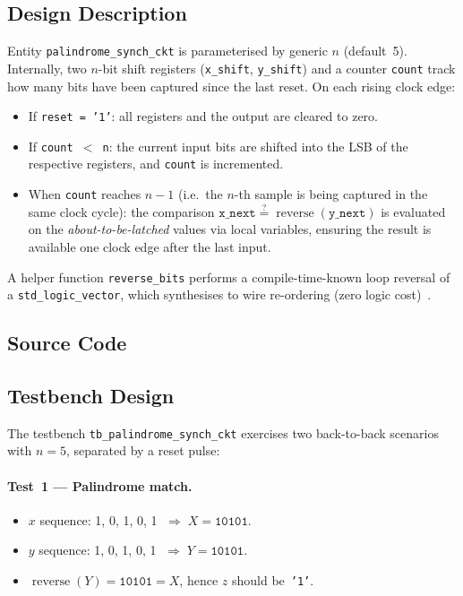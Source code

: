 \documentclass[12pt]{article}
\begin{document}
\subsection{Design Description}

Entity \texttt{palindrome\_synch\_ckt} is parameterised by
generic $n$ (default~5). Internally, two $n$-bit shift registers
(\texttt{x\_shift}, \texttt{y\_shift}) and a counter \texttt{count}
track how many bits have been captured since the last reset. On each
rising clock edge:

\begin{itemize}[nosep]
  \item If \texttt{reset = '1'}: all registers and the output are
        cleared to zero.
  \item If \texttt{count $<$ n}: the current input bits are shifted into
        the LSB of the respective registers, and \texttt{count} is
        incremented.
  \item When \texttt{count} reaches $n - 1$ (i.e.\ the $n$-th sample is
        being captured in the same clock cycle): the comparison
        $\texttt{x\_next} \stackrel{?}{=}
        \operatorname{reverse}(\texttt{y\_next})$ is evaluated on the
        \emph{about-to-be-latched} values via local variables, ensuring
        the result is available one clock edge after the last input.
\end{itemize}

\noindent
A helper function \texttt{reverse\_bits} performs a compile-time-known
loop reversal of a \texttt{std\_logic\_vector}, which synthesises to
wire re-ordering (zero logic cost)~\cite{pedroni2010}.

\subsection{Source Code}


\subsection{Testbench Design}
\label{sec:palindrome:tb}

The testbench \texttt{tb\_palindrome\_synch\_ckt} exercises two
back-to-back scenarios with $n = 5$, separated by a reset pulse:

\paragraph{Test~1 --- Palindrome match.}
\begin{itemize}[nosep]
  \item $x$ sequence: 1, 0, 1, 0, 1 $\;\Rightarrow\; X = \texttt{10101}$.
  \item $y$ sequence: 1, 0, 1, 0, 1 $\;\Rightarrow\; Y = \texttt{10101}$.
  \item $\operatorname{reverse}(Y) = \texttt{10101} = X$, hence $z$
        should be~\texttt{'1'}.
\end{itemize}
\end{document}
